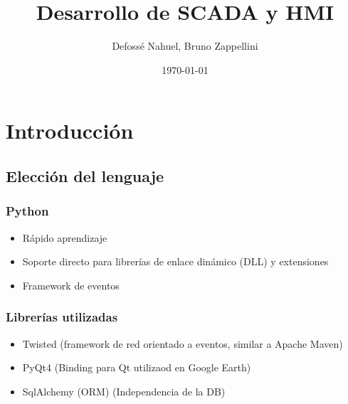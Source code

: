 \documentclass{beamer}
\title{Desarrollo de SCADA y HMI}
\author{Defossé Nahuel, Bruno Zappellini}
\date{\today}
\begin{document}
\frame{\titlepage}

\section[Outline]{}
\frame{\tableofcontents}

\section{Introducción}
\subsection{Elección del lenguaje}
\frame
{
  \frametitle{Python}

  \begin{itemize}
  \item<1-> Rápido aprendizaje
  \item<2-> Soporte directo para librerías de enlace dinámico (DLL) y extensiones
  \item<3-> Framework de eventos
  \end{itemize}
}

\frame
{
  \frametitle{Librerías utilizadas}

  \begin{itemize}
  \item<1-> Twisted (framework de red orientado a eventos, similar a Apache Maven)
  \item<2-> PyQt4 (Binding para Qt utilizaod en Google Earth)
  \item<3-> SqlAlchemy (ORM) (Independencia de la DB)
  \end{itemize}
}
\end{document}
